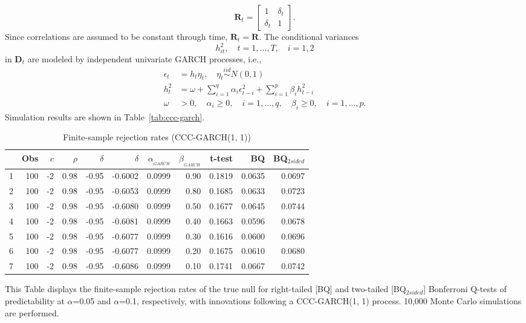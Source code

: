 \documentclass{article}
\begin{document}
\begin{equation}
\boldsymbol{R}_{t}=\left[\begin{array}{cc}{1} & {\delta_{ t}} \\ {\delta_{ t}} & {1}\end{array}\right].
\end{equation}
Since correlations are assumed to be constant through time, $\boldsymbol{R}_{t}=\boldsymbol{R}$. The conditional variances 
$${h}_{i t}^{2}, \quad t=1, \ldots, T, \quad i=1, 2$$
in $\boldsymbol{D}_{t}$ are modeled by independent univariate GARCH processes, i.e.,
\begin{equation}
\label{eqn:garch}
\begin{aligned} \epsilon_{t} &=h_{t} \eta_{t}, \quad \eta_{t} \stackrel{i i d}{\sim}N(0,1) \\ h_{t}^{2} &=\omega+\sum_{i=1}^{q} \alpha_{i} \epsilon_{t-i}^{2}+\sum_{i=1}^{p} \beta_{i} h_{t-i}^{2} \\ \omega &>0, \quad \alpha_{i} \geq 0, \quad i=1, \ldots, q, \quad \beta_{i} \geq 0, \quad i=1, \ldots, p. \end{aligned}
\end{equation}
Simulation results are shown in Table~\vref{tab:ccc-garch}.
\begin{table}[ht]
\centering
\caption{Finite-sample rejection rates (CCC-GARCH(1, 1)) }
\label{tab:ccc-garch}
\begin{threeparttable}
\begin{tabular}{rrrrrrrrrrr}
  \hline
 & Obs & $c$ & $\rho$ & $\delta$ &$\hat{\delta}$ & $\alpha_{_{GARCH}}$ & $\beta_{_{GARCH}}$ & t-test &BQ& BQ$_{{2sided}}$ \\ 
  \hline
1 & 100 & -2 & 0.98 & -0.95 & -0.6002 & 0.0999 & 0.90 & 0.1819 & 0.0635 & 0.0697 \\ 
  2 & 100 & -2 & 0.98 & -0.95 & -0.6053 & 0.0999 & 0.80 & 0.1685 & 0.0633 & 0.0723 \\ 
  3 & 100 & -2 & 0.98 & -0.95 & -0.6080 & 0.0999 & 0.50 & 0.1677 & 0.0645 & 0.0744 \\ 
  4 & 100 & -2 & 0.98 & -0.95 & -0.6081 & 0.0999 & 0.40 & 0.1663 & 0.0596 & 0.0678 \\ 
  5 & 100 & -2 & 0.98 & -0.95 & -0.6077 & 0.0999 & 0.30 & 0.1616 & 0.0600 & 0.0696 \\ 
  6 & 100 & -2 & 0.98 & -0.95 & -0.6077 & 0.0999 & 0.20 & 0.1675 & 0.0610 & 0.0680 \\ 
  7 & 100 & -2 & 0.98 & -0.95 & -0.6086 & 0.0999 & 0.10 & 0.1741 & 0.0667 & 0.0742 \\ 
   \hline
\end{tabular}
 \begin{tablenotes}
 \small
\item This Table displays the finite-sample rejection rates of the true null for right-tailed  [BQ] and two-tailed  [BQ$_{{2sided}}$] Bonferroni Q-tests of predictability at $\alpha$=0.05 and $\alpha$=0.1, respectively, with innovations following a CCC-GARCH(1, 1) process. 10,000 Monte Carlo simulations are performed.
\end{tablenotes}
\end{threeparttable}
\end{table}
\end{document}
